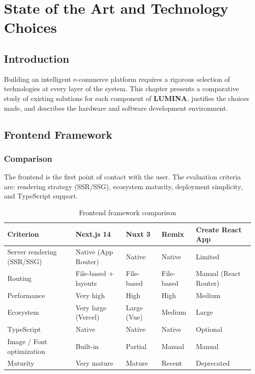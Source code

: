 \chapter{State of the Art and Technology Choices}

\section*{Introduction}
Building an intelligent e-commerce platform requires a rigorous selection of
technologies at every layer of the system.
This chapter presents a comparative study of existing solutions for each component
of \textbf{LUMINA}, justifies the choices made, and describes the hardware and
software development environment.

\section{Frontend Framework}

\subsection{Comparison}

The frontend is the first point of contact with the user.
The evaluation criteria are: rendering strategy (SSR/SSG), ecosystem maturity,
deployment simplicity, and TypeScript support.

\begin{table}[H]
\centering
\caption{Frontend framework comparison}
\begin{tabularx}{\textwidth}{|l|X|X|X|X|}
\hline
\rowcolor{gray!20}
\textbf{Criterion} & \textbf{Next.js 14} & \textbf{Nuxt 3} & \textbf{Remix} & \textbf{Create React App} \\
\hline
Server rendering (SSR/SSG) & \cellcolor{green!15}Native (App Router) & Native & Native & Limited \\
\hline
Routing & \cellcolor{green!15}File-based + layouts & File-based & File-based & Manual (React Router) \\
\hline
Performance & \cellcolor{green!15}Very high & High & High & Medium \\
\hline
Ecosystem & \cellcolor{green!15}Very large (Vercel) & Large (Vue) & Medium & Large \\
\hline
TypeScript & \cellcolor{green!15}Native & Native & Native & Optional \\
\hline
Image / Font optimization & \cellcolor{green!15}Built-in & Partial & Manual & Manual \\
\hline
Maturity & \cellcolor{green!15}Very mature & Mature & Recent & Deprecated \\
\hline
\end{tabularx}
\end{table}

